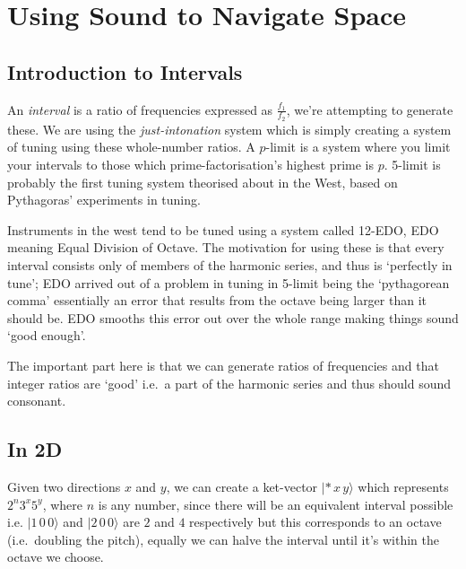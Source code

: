 \chapter{Using Sound to Navigate Space}
\section{Introduction to Intervals}
An \emph{interval} is a ratio of frequencies expressed as $\frac{f_1}{f_2}$, we're attempting to
generate these. We are using the \emph{just-intonation} system which is simply creating a system of
tuning using these whole-number ratios. A $p$-limit is a system where you limit your intervals to
those which prime-factorisation's highest prime is $p$. 5-limit is probably the first tuning system
theorised about in the West, based on Pythagoras' experiments in tuning.

Instruments in the west tend to be tuned using a system called 12-EDO, EDO meaning Equal Division of
Octave. The motivation for using these is that every interval consists only of members of the
harmonic series, and thus is `perfectly in tune'; EDO arrived out of a problem in tuning in 5-limit
being the `pythagorean comma' essentially an error that results from the octave being larger than it
should be. EDO smooths this error out over the whole range making things sound `good enough'.

The important part here is that we can generate ratios of frequencies and that integer
ratios are `good' i.e.\ a part of the harmonic series and thus should sound consonant.

\section{In 2D}

\begin{center}
\end{center}

Given two directions $x$ and $y$, we can create a ket-vector $|*\, x\, y \rangle$ which represents
$2^n 3^x 5^y$, where $n$ is any number, since there will be an equivalent interval possible i.e.
$|1\, 0\, 0\rangle$ and $|2\, 0\, 0\rangle$ are $2$ and $4$ respectively but this corresponds to an
octave (i.e.\ doubling the pitch), equally we can halve the interval until it's within the octave we
choose. 

